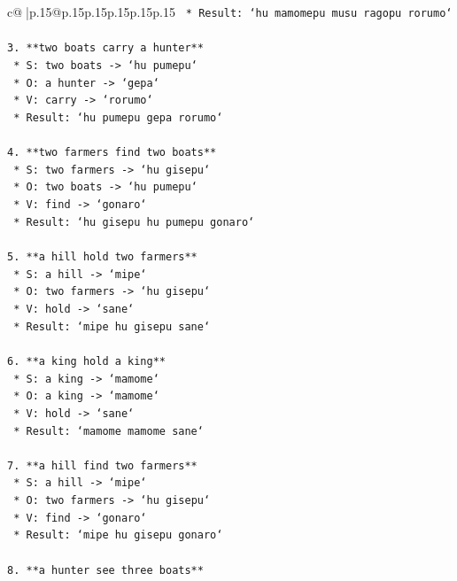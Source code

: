 \documentclass{article}
\begin{document}
{\begin{supertabular}{c@{$\;$}|p{.15\linewidth}@{}p{.15\linewidth}p{.15\linewidth}p{.15\linewidth}p{.15\linewidth}p{.15\linewidth}}
{{{\texttt{    *   Result: `hu mamomepu musu ragopu rorumo`} \\
\\ 
\texttt{3.  **two boats carry a hunter**} \\
\texttt{    *   S: two boats {-}> `hu pumepu`} \\
\texttt{    *   O: a hunter {-}> `gepa`} \\
\texttt{    *   V: carry {-}> `rorumo`} \\
\texttt{    *   Result: `hu pumepu gepa rorumo`} \\
\\ 
\texttt{4.  **two farmers find two boats**} \\
\texttt{    *   S: two farmers {-}> `hu gisepu`} \\
\texttt{    *   O: two boats {-}> `hu pumepu`} \\
\texttt{    *   V: find {-}> `gonaro`} \\
\texttt{    *   Result: `hu gisepu hu pumepu gonaro`} \\
\\ 
\texttt{5.  **a hill hold two farmers**} \\
\texttt{    *   S: a hill {-}> `mipe`} \\
\texttt{    *   O: two farmers {-}> `hu gisepu`} \\
\texttt{    *   V: hold {-}> `sane`} \\
\texttt{    *   Result: `mipe hu gisepu sane`} \\
\\ 
\texttt{6.  **a king hold a king**} \\
\texttt{    *   S: a king {-}> `mamome`} \\
\texttt{    *   O: a king {-}> `mamome`} \\
\texttt{    *   V: hold {-}> `sane`} \\
\texttt{    *   Result: `mamome mamome sane`} \\
\\ 
\texttt{7.  **a hill find two farmers**} \\
\texttt{    *   S: a hill {-}> `mipe`} \\
\texttt{    *   O: two farmers {-}> `hu gisepu`} \\
\texttt{    *   V: find {-}> `gonaro`} \\
\texttt{    *   Result: `mipe hu gisepu gonaro`} \\
\\ 
\texttt{8.  **a hunter see three boats**} \\
}}}
\end{supertabular}}
\end{document}
